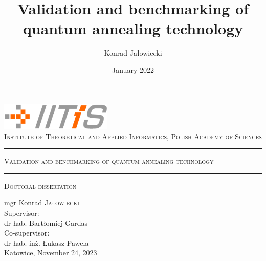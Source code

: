 \documentclass[11pt,dvipsnames,twoside,openright]{memoir}
\title{Validation and benchmarking of quantum annealing technology}
\author{Konrad Jałowiecki}
\date{January 2022}
\theoremstyle{definition}
\begin{document}
\begin{titlingpage}
  \begin{center}
    \includegraphics[width=0.4\textwidth]{figures/iitis_logo}\\
    \vspace{0.5em}
    \textsc{\large Institute of Theoretical and Applied Informatics, Polish Academy of Sciences}
    \vspace*{1in}
    \hrule
    \vspace*{0.5em}
    \textsc{\huge Validation and benchmarking of quantum annealing technology}
    \vspace*{0.5em}
    \hrule
    \vspace*{1em}
    \textsc{\large Doctoral dissertation}
    \par
    \vspace{1.5in}
    {\large mgr Konrad \textsc{Jałowiecki}}\\
    \vspace{0.25in}
    Supervisor:\\ dr hab. Bartłomiej Gardas\\
    \vspace{0.25in}
    Co-supervisor:\\ dr hab. inż. Łukasz Pawela\\
    \vfill
    {Katowice, November 24, 2023}
  \end{center}
\end{titlingpage}
\end{document}
